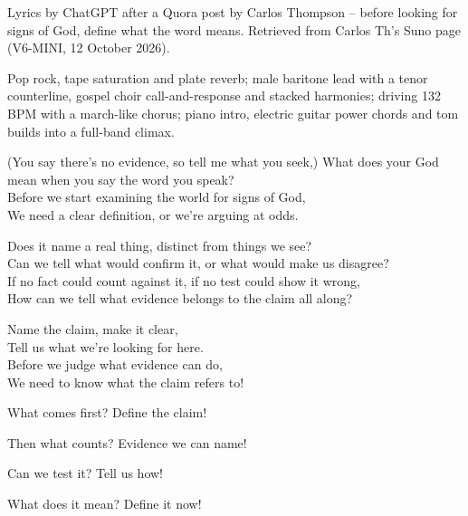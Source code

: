 
\begin{notes}
Lyrics by ChatGPT after a Quora post by Carlos Thompson -- before looking for signs of God, define what the word means. Retrieved from Carlos Th's Suno page (V6-MINI, 12 October 2026).
\end{notes}
\begin{style}
Pop rock, tape saturation and plate reverb; male baritone lead with a tenor counterline, gospel choir call-and-response and stacked harmonies; driving 132 BPM with a march-like chorus; piano intro, electric guitar power chords and tom builds into a full-band climax.
\end{style}
\begin{lyrics}
 (You say there's no evidence, so tell me what you seek,)
 What does your God mean when you say the word you speak?\\
Before we start examining the world for signs of God,\\
We need a clear definition, or we're arguing at odds.

 Does it name a real thing, distinct from things we see?\\
Can we tell what would confirm it, or what would make us disagree?\\
If no fact could count against it, if no test could show it wrong,\\
How can we tell what evidence belongs to the claim all along?


Name the claim, make it clear,\\
Tell us what we're looking for here.\\
Before we judge what evidence can do,\\
We need to know what the claim refers to!


 What comes first?
 Define the claim!

 Then what counts?
 Evidence we can name!

 Can we test it?
 Tell us how!

 What does it mean?
 Define it now!


\end{lyrics}
